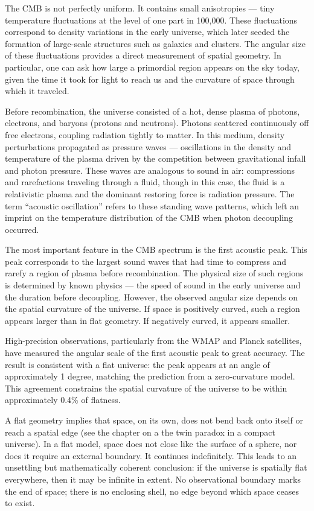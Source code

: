 The CMB is not perfectly uniform. It contains small anisotropies — tiny temperature fluctuations at the level of one part in 100,000. These fluctuations correspond to density variations in the early universe, which later seeded the formation of large-scale structures such as galaxies and clusters. The angular size of these fluctuations provides a direct measurement of spatial geometry. In particular, one can ask how large a primordial region appears on the sky today, given the time it took for light to reach us and the curvature of space through which it traveled.

Before recombination, the universe consisted of a hot, dense plasma of photons, electrons, and baryons (protons and neutrons). Photons scattered continuously off free electrons, coupling radiation tightly to matter. In this medium, density perturbations propagated as pressure waves — oscillations in the density and temperature of the plasma driven by the competition between gravitational infall and photon pressure. These waves are analogous to sound in air: compressions and rarefactions traveling through a fluid, though in this case, the fluid is a relativistic plasma and the dominant restoring force is radiation pressure. The term “acoustic oscillation” refers to these standing wave patterns, which left an imprint on the temperature distribution of the CMB when photon decoupling occurred.

The most important feature in the CMB spectrum is the first acoustic peak. This peak corresponds to the largest sound waves that had time to compress and rarefy a region of plasma before recombination. The physical size of such regions is determined by known physics — the speed of sound in the early universe and the duration before decoupling. However, the observed angular size depends on the spatial curvature of the universe. If space is positively curved, such a region appears larger than in flat geometry. If negatively curved, it appears smaller.

High-precision observations, particularly from the WMAP and Planck satellites, have measured the angular scale of the first acoustic peak to great accuracy. The result is consistent with a flat universe: the peak appears at an angle of approximately 1 degree, matching the prediction from a zero-curvature model. This agreement constrains the spatial curvature of the universe to be within approximately 0.4\% of flatness.

A flat geometry implies that space, on its own, does not bend back onto itself or reach a spatial edge (see the chapter on a the twin paradox in a compact universe). In a flat model, space does not close like the surface of a sphere, nor does it require an external boundary. It continues indefinitely. This leads to an unsettling but mathematically coherent conclusion: if the universe is spatially flat everywhere, then it may be infinite in extent. No observational boundary marks the end of space; there is no enclosing shell, no edge beyond which space ceases to exist.

